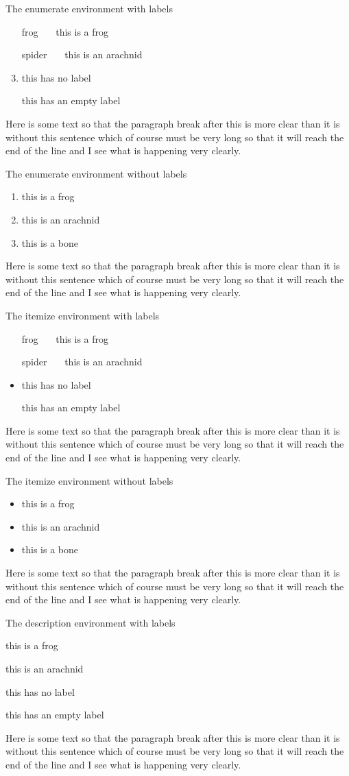 \documentclass{article}
\begin{document}
The enumerate environment with labels
\begin{enumerate}
\item[frog~~~] this is a frog
\item[spider~~~] this is an arachnid
\item this has no label
\item[] this has an empty label
\end{enumerate}
Here is some text so that the paragraph break after this
is more clear than it is without this sentence which of
course must be very long so that it will reach the end of
the line and I see what is happening very clearly.

 The
enumerate environment without labels
\begin{enumerate}
\item this is a frog
\item this is an arachnid
\item this is a bone
\end{enumerate}
Here is some text so that the paragraph break after this
is more clear than it is without this sentence which of
course must be very long so that it will reach the end of
the line and I see what is happening very clearly.

The itemize environment with labels
\begin{itemize}
\item[frog~~~] this is a frog
\item[spider~~~] this is an arachnid
\item this has no label
\item[] this has an empty label
\end{itemize}
Here is some text so that the paragraph break after this
is more clear than it is without this sentence which of
course must be very long so that it will reach the end of
the line and I see what is happening very clearly.

The itemize environment without labels
\begin{itemize}
\item this is a frog
\item this is an arachnid
\item this is a bone
\end{itemize}
Here is some text so that the paragraph break after this
is more clear than it is without this sentence which of
course must be very long so that it will reach the end of
the line and I see what is happening very clearly.

The description environment with labels
\begin{description}
\item[frog~~~] this is a frog
\item[spider~~~] this is an arachnid
\item this has no label
\item[] this has an empty label
\end{description}
Here is some text so that the paragraph break after this
is more clear than it is without this sentence which of
course must be very long so that it will reach the end of
the line and I see what is happening very clearly.
\end{document}
